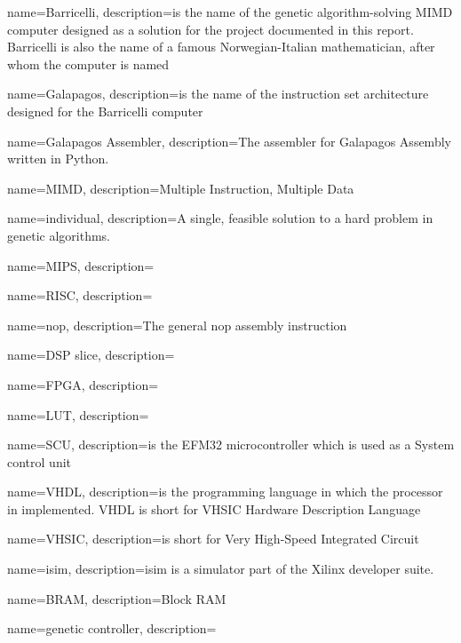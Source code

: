 {
name=Barricelli,
description={is the name of the genetic algorithm-solving MIMD computer designed as a solution for the project documented in this report. Barricelli is also the name of a famous Norwegian-Italian mathematician, after whom the computer is named}
}

{
name=Galapagos,
description={is the name of the instruction set architecture designed for the Barricelli computer}
}

{
name=Galapagos Assembler,
description={The assembler for Galapagos Assembly written in Python.}
}

{
name=MIMD,
description={Multiple Instruction, Multiple Data}
}

{
name=individual,
description={A single, feasible solution to a hard problem in genetic algorithms.}
}

{
name=MIPS,
description={}
}

{
name=RISC,
description={}
}

{
name=nop,
description={The general nop assembly instruction }
}

{
name=DSP slice,
description={}
}

{
name=FPGA,
description={}
}

{
name=LUT,
description={}
}

{
name=SCU,
description={is the EFM32 microcontroller which is used as a System control unit}
}

{
name=VHDL,
description={is the programming language in which the processor in implemented. VHDL is short for \gls{VHSIC} Hardware Description Language}
}

{
name=VHSIC,
description={is short for Very High-Speed Integrated Circuit}
}

{
name=isim,
description={isim is a simulator part of the Xilinx developer suite.}
}

{
name=BRAM,
description={Block RAM }
}

{
name=genetic controller,
description={}
}

